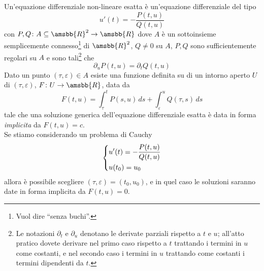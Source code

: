 \begin{definition}
    \label{def:11.5}
    Un'equazione differenziale non-lineare esatta è un'equazione differenziale del tipo
    \[
    u'(t) = -\frac{P(t,u)}{Q(t,u)}
    \]
    con $P, Q \colon A\subseteq\amsbb{R}^2 \to \amsbb{R}$ dove $A$ è un sottoinsieme semplicemente connesso\footnote{Vuol dire ``senza buchi''.} di $\amsbb{R}^2$, $Q\ne 0$ su $A$, $P,Q$ sono sufficientemente regolari su $A$ e sono tali\footnote{Le notazioni $\partial_t$ e $\partial_u$ denotano le derivate parziali rispetto a $t$ e $u$; all'atto pratico dovete derivare nel primo caso rispetto a $t$ trattando i termini in $u$ come costanti, e nel secondo caso i termini in $u$ trattando come costanti i termini dipendenti da $t$.} che
    \[
    \partial_u P(t,u) = \partial_t Q(t,u)
    \]
     Dato un punto $(\tau, \varepsilon)\in A$ esiste una funzione definita su di un intorno aperto $U$ di $(\tau, \varepsilon)$, $F\colon U\to\amsbb{R}$, data da
     \begin{equation}
         \label{eq:11.2}
         F(t,u) = \int_\tau^t P(s,u)\, ds + \int_\varepsilon^u Q(\tau, s)\, ds
     \end{equation}
     tale che una soluzione generica dell'equazione differenziale esatta è data in forma \emph{implicita} da $F(t,u)=c$.\\
     Se stiamo considerando un problema di Cauchy
     \[
     \begin{dcases}
         u'(t) = -\frac{P(t,u)}{Q(t,u)} \\
         u(t_0) = u_0
     \end{dcases}
     \]
     allora è possibile scegliere $(\tau, \varepsilon) = (t_0, u_0)$, e in quel caso le soluzioni saranno date in forma implicita da $F(t,u) = 0$.
\end{definition}

